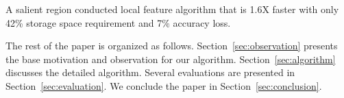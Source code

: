 \item A salient region conducted local feature algorithm that is 1.6X faster with only 42\% storage space requirement and 7\% accuracy loss.
\squishend

The rest of the paper is organized as follows. Section~\ref{sec:observation} presents the base motivation and observation for our algorithm. Section~\ref{sec:algorithm} discusses the detailed algorithm. Several evaluations are presented in Section~\ref{sec:evaluation}. We conclude the paper in Section~\ref{sec:conclusion}.